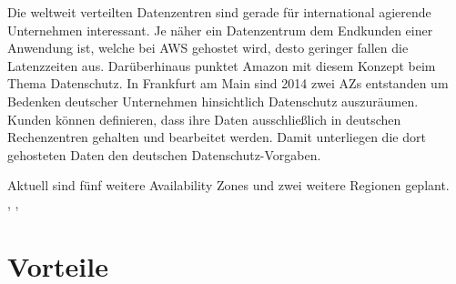 {Die weltweit verteilten Datenzentren sind gerade für international agierende Unternehmen interessant. Je näher ein Datenzentrum dem Endkunden einer Anwendung ist, welche bei AWS gehostet wird, desto geringer fallen die Latenzzeiten aus. Darüberhinaus punktet Amazon mit diesem Konzept beim Thema Datenschutz. In Frankfurt am Main sind 2014 zwei AZs entstanden um Bedenken deutscher Unternehmen hinsichtlich Datenschutz auszuräumen. Kunden können definieren, dass ihre Daten ausschließlich in deutschen Rechenzentren gehalten und bearbeitet werden. Damit unterliegen die dort gehosteten Daten den deutschen Datenschutz-Vorgaben.

Aktuell sind fünf weitere Availability Zones und zwei weitere Regionen geplant.
\\ \cite{computerwoche:reder}, \cite{aws:regions}, \cite{aws:azs}


\section{Vorteile}

}
